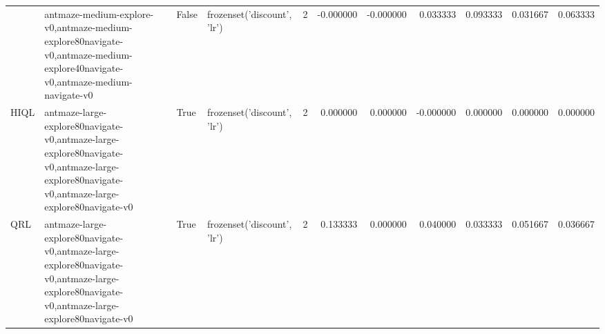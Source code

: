 \begin{tabular}{llllrrrrrrr}
\cline{2-11} \cline{3-11}
 & antmaze-medium-explore-v0,antmaze-medium-explore80navigate-v0,antmaze-medium-explore40navigate-v0,antmaze-medium-navigate-v0 & False & frozenset({'discount', 'lr'}) & 2 & -0.000000 & -0.000000 & 0.033333 & 0.093333 & 0.031667 & 0.063333 \\
\cline{1-11} \cline{2-11} \cline{3-11}
HIQL & antmaze-large-explore80navigate-v0,antmaze-large-explore80navigate-v0,antmaze-large-explore80navigate-v0,antmaze-large-explore80navigate-v0 & True & frozenset({'discount', 'lr'}) & 2 & 0.000000 & 0.000000 & -0.000000 & 0.000000 & 0.000000 & 0.000000 \\
\cline{1-11} \cline{2-11} \cline{3-11}
QRL & antmaze-large-explore80navigate-v0,antmaze-large-explore80navigate-v0,antmaze-large-explore80navigate-v0,antmaze-large-explore80navigate-v0 & True & frozenset({'discount', 'lr'}) & 2 & 0.133333 & 0.000000 & 0.040000 & 0.033333 & 0.051667 & 0.036667 \\
\cline{1-11} \cline{2-11} \cline{3-11}
\bottomrule
\end{tabular}
